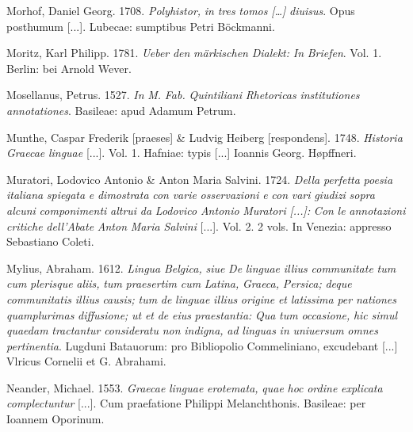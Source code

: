 \documentclass[output=paper]{langsci/langscibook}
\begin{document}
Morhof, Daniel Georg. 1708. \textit{Polyhistor,} \textit{in} \textit{tres} \textit{tomos} \textit{[…]} \textit{diuisus}. Opus posthumum [...]. Lubecae: sumptibus Petri Böckmanni.

Moritz, Karl Philipp. 1781. \textit{Ueber} \textit{den} \textit{märkischen} \textit{Dialekt:} \textit{In} \textit{Briefen}. Vol. 1. Berlin: bei Arnold Wever.

Mosellanus, Petrus. 1527. \textit{In} \textit{M.} \textit{Fab.} \textit{Quintiliani} \textit{Rhetoricas} \textit{institutiones} \textit{annotationes}. Basileae: apud Adamum Petrum.

Munthe, Caspar Frederik [praeses] \& Ludvig Heiberg [respondens]. 1748. \textit{Historia} \textit{Graecae} \textit{linguae} [...]. Vol. 1. Hafniae: typis [...] Ioannis Georg. Høpffneri.

Muratori, Lodovico Antonio \& Anton Maria Salvini. 1724. \textit{Della} \textit{perfetta} \textit{poesia} \textit{italiana} \textit{spiegata} \textit{e} \textit{dimostrata} \textit{con} \textit{varie} \textit{osservazioni} \textit{e} \textit{con} \textit{vari} \textit{giudizi} \textit{sopra} \textit{alcuni} \textit{componimenti} \textit{altrui} \textit{da} \textit{Lodovico} \textit{Antonio} \textit{Muratori} \textit{[...]:} \textit{Con} \textit{le} \textit{annotazioni} \textit{critiche} \textit{dell’Abate} \textit{Anton} \textit{Maria} \textit{Salvini} [...]. Vol. 2. 2 vols. In Venezia: appresso Sebastiano Coleti.

Mylius, Abraham. 1612. \textit{Lingua} \textit{Belgica,} \textit{siue} \textit{De} \textit{linguae} \textit{illius} \textit{communitate} \textit{tum} \textit{cum} \textit{plerisque} \textit{aliis,} \textit{tum} \textit{praesertim} \textit{cum} \textit{Latina,} \textit{Graeca,} \textit{Persica;} \textit{deque} \textit{communitatis} \textit{illius} \textit{causis;} \textit{tum} \textit{de} \textit{linguae} \textit{illius} \textit{origine} \textit{et} \textit{latissima} \textit{per} \textit{nationes} \textit{quamplurimas} \textit{diffusione;} \textit{ut} \textit{et} \textit{de} \textit{eius} \textit{praestantia:} \textit{Qua} \textit{tum} \textit{occasione,} \textit{hic} \textit{simul} \textit{quaedam} \textit{tractantur} \textit{consideratu} \textit{non} \textit{indigna,} \textit{ad} \textit{linguas} \textit{in} \textit{uniuersum} \textit{omnes} \textit{pertinentia}. Lugduni Batauorum: pro Bibliopolio Commeliniano, excudebant [...] Vlricus Cornelii et G. Abrahami.

Neander, Michael. 1553. \textit{Graecae} \textit{linguae} \textit{erotemata,} \textit{quae} \textit{hoc} \textit{ordine} \textit{explicata} \textit{complectuntur} [...]. Cum praefatione Philippi Melanchthonis. Basileae: per Ioannem Oporinum.
\end{document}
